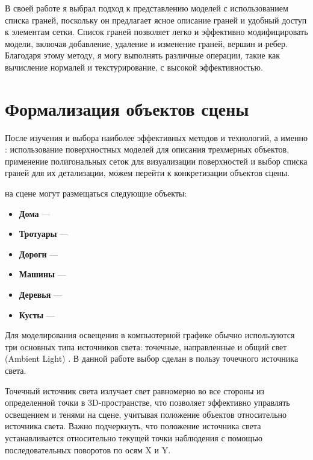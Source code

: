 В своей работе я выбрал подход к представлению моделей с использованием списка граней, поскольку он предлагает ясное описание граней и удобный доступ к элементам сетки. Список граней позволяет легко и эффективно модифицировать модели, включая добавление, удаление и изменение граней, вершин и ребер. Благодаря этому методу, я могу выполнять различные операции, такие как вычисление нормалей и текстурирование, с высокой эффективностью.




\section{Формализация объектов сцены}
 
После изучения и выбора наиболее эффективных методов и технологий, а именно : использование поверхностных моделей для описания трехмерных объектов, применение полигональных сеток для визуализации поверхностей и выбор списка граней для их детализации, можем перейти к конкретизации объектов сцены. 

на сцене могут размещаться следующие объекты:
	\begin{itemize}
		\item \textbf{Дома} --- 
		\item \textbf{Тротуары} --- 
		\item \textbf{Дороги} --- 
		\item \textbf{Машины} --- 
		\item \textbf{Деревья} --- 
		\item \textbf{Кусты} --- 
		\end{itemize}
		
Для моделирования освещения в компьютерной графике обычно используются три основных типа источников света: точечные, направленные и общий свет (Ambient Light) \cite{light}. В данной работе выбор сделан в пользу точечного источника света.

Точечный источник света излучает свет равномерно во все стороны из определенной точки в 3D-пространстве, что позволяет эффективно управлять освещением и тенями на сцене, учитывая положение объектов относительно источника света. Важно подчеркнуть, что положение источника света устанавливается относительно текущей точки наблюдения с помощью последовательных поворотов по осям X и Y.

